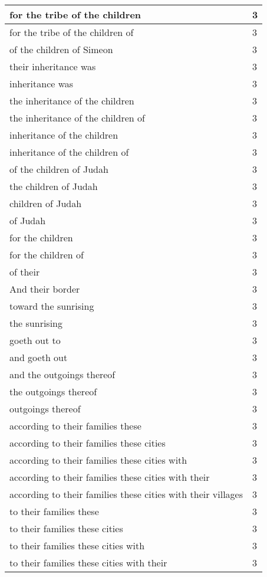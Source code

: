 \begin{center}
\begin{longtable}{|p{3.0in}|p{0.5in}|}
for the tribe of the children & 3\\ \hline 
for the tribe of the children of & 3\\ \hline 
of the children of Simeon & 3\\ \hline 
their inheritance was & 3\\ \hline 
inheritance was & 3\\ \hline 
the inheritance of the children & 3\\ \hline 
the inheritance of the children of & 3\\ \hline 
inheritance of the children & 3\\ \hline 
inheritance of the children of & 3\\ \hline 
of the children of Judah & 3\\ \hline 
the children of Judah & 3\\ \hline 
children of Judah & 3\\ \hline 
of Judah & 3\\ \hline 
for the children & 3\\ \hline 
for the children of & 3\\ \hline 
of their & 3\\ \hline 
And their border & 3\\ \hline 
toward the sunrising & 3\\ \hline 
the sunrising & 3\\ \hline 
goeth out to & 3\\ \hline 
and goeth out & 3\\ \hline 
and the outgoings thereof & 3\\ \hline 
the outgoings thereof & 3\\ \hline 
outgoings thereof & 3\\ \hline 
according to their families these & 3\\ \hline 
according to their families these cities & 3\\ \hline 
according to their families these cities with & 3\\ \hline 
according to their families these cities with their & 3\\ \hline 
according to their families these cities with their villages & 3\\ \hline 
to their families these & 3\\ \hline 
to their families these cities & 3\\ \hline 
to their families these cities with & 3\\ \hline 
to their families these cities with their & 3\\ \hline 

\end{longtable}
\end{center}
